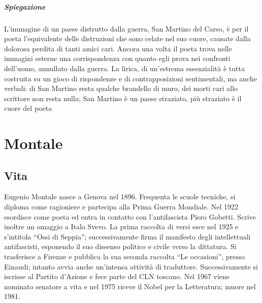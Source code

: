 \documentclass[12pt]{report}
\begin{document}
		\subparagraph[San Martino del carso]{Spiegazione} L’immagine di un paese distrutto dalla guerra, San Martino del Carso, è per il poeta l’equivalente delle distruzioni che sono celate nel suo cuore, causate dalla dolorosa perdita di tanti amici cari. Ancora una volta il poeta trova nelle immagini esterne una corrispondenza con quanto egli prova nei confronti dell’uomo, annullato dalla guerra. La lirica, di un’estrema essenzialità è tutta costruita su un gioco di rispondenze e di contrapposizioni sentimentali, ma anche verbali: di San Martino resta qualche brandello di muro, dei morti cari allo scrittore non resta nulla; San Martino è un paese straziato, più straziato è il cuore del poeta
		
		
		
		
		
		
	
		\section{Montale}
		\subsection{Vita}
		Eugenio Montale nasce a Genova nel 1896. Frequenta le scuole tecniche, si diploma come ragioniere e partecipa alla Prima Guerra Mondiale. Nel 1922 esordisce come poeta ed entra in contatto con l’antifascista Piero Gobetti. Scrive inoltre un omaggio a Italo Svevo. La prima raccolta di versi esce nel 1925 e s’intitola “Ossi di Seppia”; successivamente firma il manifesto degli intellettuali antifascisti, esponendo il suo dissenso politico e civile verso la dittatura. Si trasferisce a Firenze e pubblica la sua seconda raccolta “Le occasioni”, presso Einaudi; 
		intanto avvia anche un’intensa attività di traduttore. Successivamente si iscrisse al Partito d’Azione e fece parte del CLN toscano. Nel 1967 viene nominato senatore a vita e nel 1975 riceve il Nobel per la Letteratura; muore nel 1981.
		
\end{document}
